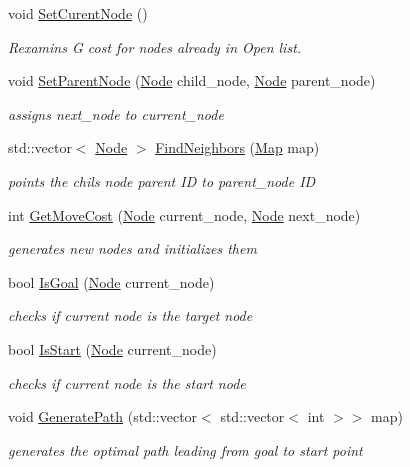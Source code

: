 \begin{DoxyCompactItemize}
void \hyperlink{classAstar_ae5e558c5849378e1d22b1f218b51916c}{Set\+Curent\+Node} ()
\begin{DoxyCompactList}\small\item\em Rexamins G cost for nodes already in Open list. \end{DoxyCompactList}\item 
void \hyperlink{classAstar_a4586f8da059cd55dde359e4af6f91b34}{Set\+Parent\+Node} (\hyperlink{classNode}{Node} child\+\_\+node, \hyperlink{classNode}{Node} parent\+\_\+node)
\begin{DoxyCompactList}\small\item\em assigns next\+\_\+node to current\+\_\+node \end{DoxyCompactList}\item 
std\+::vector$<$ \hyperlink{classNode}{Node} $>$ \hyperlink{classAstar_a6a489aeb6fbf448665889079480ed0ef}{Find\+Neighbors} (\hyperlink{classMap}{Map} map)
\begin{DoxyCompactList}\small\item\em points the chil\textquotesingle{}s node parent ID to parent\+\_\+node ID \end{DoxyCompactList}\item 
int \hyperlink{classAstar_a48c9d3c893777f53b0b60bab9374748a}{Get\+Move\+Cost} (\hyperlink{classNode}{Node} current\+\_\+node, \hyperlink{classNode}{Node} next\+\_\+node)
\begin{DoxyCompactList}\small\item\em generates new nodes and initializes them \end{DoxyCompactList}\item 
bool \hyperlink{classAstar_a10cc31d1f9217c5b03ec6d4167e8c639}{Is\+Goal} (\hyperlink{classNode}{Node} current\+\_\+node)
\begin{DoxyCompactList}\small\item\em checks if current node is the target node \end{DoxyCompactList}\item 
bool \hyperlink{classAstar_a95ddd1acd8f580a0dff7ab4596a11e17}{Is\+Start} (\hyperlink{classNode}{Node} current\+\_\+node)
\begin{DoxyCompactList}\small\item\em checks if current node is the start node \end{DoxyCompactList}\item 
void \hyperlink{classAstar_ab5e2af854f42ac2ee12827876175bb3b}{Generate\+Path} (std\+::vector$<$ std\+::vector$<$ int $>$$>$ map)
\begin{DoxyCompactList}\small\item\em generates the optimal path leading from goal to start point \end{DoxyCompactList}\end{DoxyCompactItemize}


